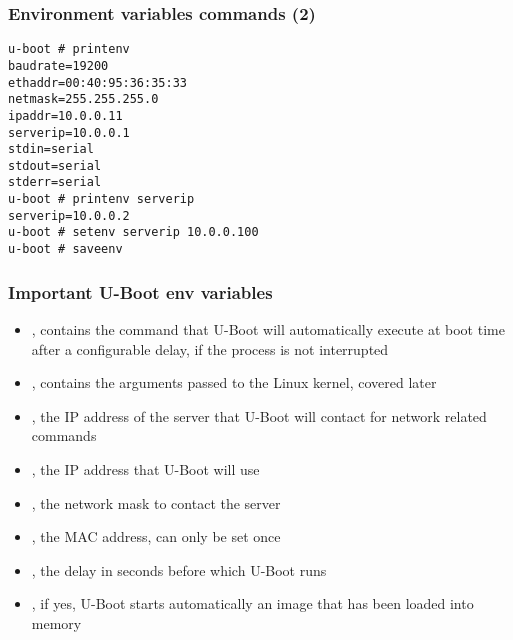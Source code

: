 \begin{frame}[fragile]
\frametitle{Environment variables commands (2)}
\begin{verbatim}
u-boot # printenv
baudrate=19200
ethaddr=00:40:95:36:35:33
netmask=255.255.255.0
ipaddr=10.0.0.11
serverip=10.0.0.1
stdin=serial
stdout=serial
stderr=serial
u-boot # printenv serverip
serverip=10.0.0.2
u-boot # setenv serverip 10.0.0.100
u-boot # saveenv
\end{verbatim}
\end{frame}

\begin{frame}
  \frametitle{Important U-Boot env variables}
  \begin{itemize}
  \item {}, contains the command that U-Boot will
    automatically execute at boot time after a configurable delay, if
    the process is not interrupted
  \item {}, contains the arguments passed to the Linux
    kernel, covered later
  \item {}, the IP address of the server that U-Boot will
    contact for network related commands
  \item {}, the IP address that U-Boot will use
  \item {}, the network mask to contact the server
  \item {}, the MAC address, can only be set once
  \item {}, the delay in seconds before which U-Boot
    runs 
  \item {}, if yes, U-Boot starts automatically an image
    that has been loaded into memory
  \end{itemize}
\end{frame}

